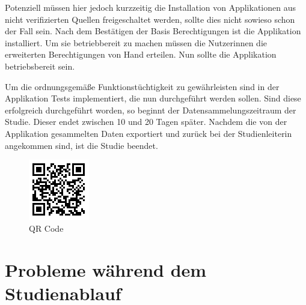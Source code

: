 Potenziell müssen hier jedoch kurzzeitig die Installation von Applikationen aus nicht verifizierten Quellen freigeschaltet werden, sollte dies nicht sowieso schon der Fall sein.
Nach dem Bestätigen der Basis Berechtigungen ist die Applikation installiert.
Um sie betriebbereit zu machen müssen die Nutzerinnen die erweiterten Berechtigungen von Hand erteilen.
Nun sollte die Applikation betriebsbereit sein.
\par
Um die ordnungsgemäße Funktionstüchtigkeit zu gewährleisten sind in der Applikation Tests implementiert, die nun durchgeführt werden sollen.
Sind diese erfolgreich durchgeführt worden, so beginnt der Datensammelungszeitraum der Studie.
Dieser endet zwischen 10 und 20 Tagen später.
Nachdem die von der Applikation gesammelten Daten exportiert und zurück bei der Studienleiterin angekommen sind, 
ist die Studie beendet.

\begin{figure}[h]
    \centering
    \includegraphics{images/qrcode.png}
    \caption{QR Code}
    \label{fig:qrcode}
\end{figure}


\section{Probleme während dem Studienablauf}

